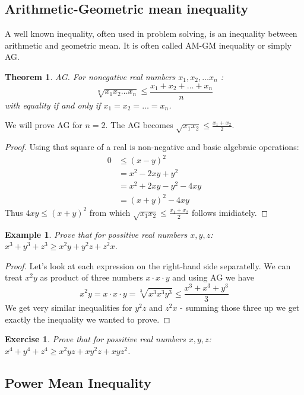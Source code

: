\documentclass[11pt,a5paper]{article}
\newtheorem{theorem}{Example}
\newtheorem{exercise}{Exercise}
\newtheorem*{Theorem}{Theorem}
\begin{document}
\subsection*{Arithmetic-Geometric mean inequality}

A well known inequality, often used in problem solving, is an inequality between arithmetic and geometric mean. It is often called AM-GM inequality or simply AG.

\begin{Theorem} \emph{AG.}
For nonegative real numbers $x_1, x_2, \dots x_n$ : 
\[\sqrt[n]{x_1x_2\dots x_n} \le  \frac{x_1 + x_2 + \dots + x_n}{n}\] with equality if and only if $x_1 = x_2 = \dots = x_n$. \\
\end{Theorem}

\noindent We will prove AG for $n=2$. The AG becomes $\sqrt{x_1x_2} \le  \frac{x_1 + x_2}{2}$. 
\begin{proof} Using that square of a real is non-negative and basic algebraic operations:
	\begin{align*}
	0 & \le (x-y)^2 \\
	 & = x^2 - 2xy + y^2 \\
	 & = x^2 + 2xy - y^2 -4xy \\
	 & = (x+y)^2 - 4xy 
	\end{align*}
	Thus $4xy \le (x+y)^2$ from which $\sqrt{x_1x_2} \le  \frac{x_1 + x_2}{2}$ follows imidiately. 
\end{proof}

\begin{theorem}
	Prove that for possitive real numbers $x, y, z$: $x^3 + y^3 + z^3 \ge x^2y + y^2z + z^2x$.
\end{theorem}
\begin{proof} Let's look at each expression on the right-hand side separatelly. We can treat $x^2y$ as product of three numbers $x\cdot x\cdot y$ and using AG we have 
\[x^2y = x\cdot x\cdot y = \sqrt[3]{x^3x^3y^3} \le\frac{x^3 + x^3 + y^3}{3}\]
We get very similar inequalities for $y^2z$ and $z^2x$ - summing those three up we get exactly the inequality we wanted to prove.
\end{proof}

\begin{exercise} Prove that for possitive real numbers $x, y, z$: $x^4 + y^4 + z^4 \ge x^2yz + xy^2z + xyz^2$.
\end{exercise}

\subsection*{Power Mean Inequality}
\end{document}
